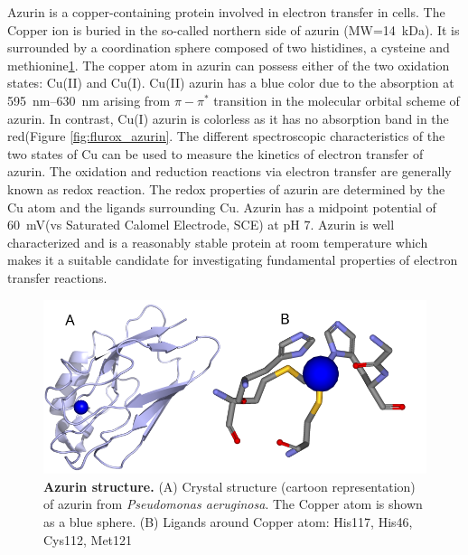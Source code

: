 Azurin is a copper-containing protein involved in electron transfer in cells.\cite{dennison2005investigating,kolczak2006handbook}
The Copper ion is buried in the so-called northern side of azurin (MW=\SI{14}{\kilo\dalton}). It is surrounded by a coordination sphere composed of two histidines, a cysteine and methionine\ref{fig:azurin_structure}.
The copper atom in azurin can possess either of the two oxidation states: Cu(II) and Cu(I).
Cu(II) azurin has a blue color due to the absorption at \SIrange{595}{630}{\nm} arising from $\pi - \pi^*$ transition in the molecular orbital scheme of azurin.\cite{dooley1981spectroscopic,schmauder2005sensitive}
In contrast, Cu(I) azurin is colorless as it has no absorption band in the red(Figure \ref{fig:flurox_azurin}.
The different spectroscopic characteristics of the two states of Cu can be used to measure the kinetics of electron transfer of azurin.
The oxidation and reduction reactions via electron transfer are generally known as redox reaction.
The redox properties of azurin are determined by the Cu atom and the ligands surrounding Cu.
Azurin has a midpoint potential of \SI{60}{\mV}(vs Saturated Calomel Electrode, SCE) at pH 7.
Azurin is well characterized and is a reasonably stable protein at room temperature which makes it a suitable candidate for investigating fundamental properties of electron transfer reactions.
\begin{figure}
	\centering
	\includegraphics[width=\textwidth]{azurin_structure}
	\caption{\textbf{Azurin structure.} (A) Crystal structure (cartoon representation) of azurin from \textit{Pseudomonas aeruginosa}.\cite{adman1981structural}
	The Copper atom is shown as a blue sphere.
	(B) Ligands around Copper atom: His117, His46, Cys112, Met121}
	\label{fig:azurin_structure}
\end{figure}


